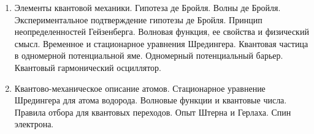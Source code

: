 \begin{enumerate}
    \item Элементы квантовой механики. Гипотеза де Бройля. Волны де Бройля. Экспериментальное 
    подтверждение гипотезы де Бройля. Принцип неопределенностей Гейзенберга. Волновая 
    функция, ее свойства и физический смысл. Временное и стационарное уравнения Шредингера. 
    Квантовая частица в одномерной потенциальной яме. Одномерный потенциальный барьер. 
    Квантовый гармонический осциллятор. 

    \item Квантово-механическое описание атомов. Стационарное уравнение Шредингера для атома 
    водорода. Волновые функции и квантовые числа. Правила отбора для квантовых переходов. 
    Опыт Штерна и Герлаха. Спин электрона.

\end{enumerate}
